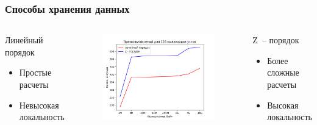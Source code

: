 \documentclass[presentation,18pt]{beamer}
\begin{document}
\begin{frame}[t]
	\label{data-order}
	\frametitle{Способы хранения данных}

	\begin{columns}

		\begin{block}{Линейный порядок}
			\begin{itemize}
				\item Простые расчеты
				\item Невысокая локальность
			\end{itemize}
		\end{block}

		\begin{alertblock}{} %
			\begin{figure}
				\includegraphics[width=\textwidth]{img/GraphLayout.png}
			\end{figure}
		\end{alertblock}

		\begin{block}{Z~-- порядок}
			\begin{itemize}
				\item Более сложные расчеты
				\item Высокая локальность
			\end{itemize}


\end{block}
\end{columns}
\end{frame}
\end{document}
